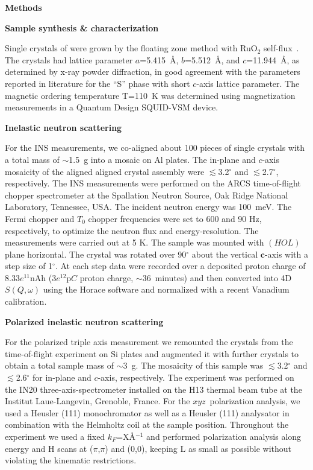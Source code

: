 
\vspace{20 pt}
\noindent
{\bf Methods}

\vspace{10 pt}
\noindent
{\bf Sample synthesis \& characterization}

\noindent
%
Single crystals of \CRO were grown by the floating zone method with RuO$_{2}$
self-flux~\cite{Nakatsuji97,Cao97}. The crystals had lattice parameter
$a$=5.415~\r{A}, $b$=5.512~\r{A}, and $c$=11.944~\r{A}, as determined by x-ray
powder diffraction, in good agreement with the parameters reported in
literature\cite{braden98aps} for the ``S'' phase with short $c$-axis lattice parameter.
The magnetic ordering temperature T=110~K was determined using magnetization
measurements in a Quantum Design SQUID-VSM device.

\vspace{10 pt}
\noindent
{\bf Inelastic neutron scattering}

\noindent
%
For the INS measurements, we co-aligned about 100 pieces of single crystals
with a total mass of $\sim$1.5~g into a mosaic on Al plates. The in-plane and
$c$-axis mosaicity of the aligned aligned crystal assembly were
$\lesssim$3.2$^\circ$ and  $\lesssim$2.7$^\circ$, respectively. The INS
measurements were performed on the ARCS time-of-flight chopper spectrometer at
the Spallation Neutron Source, Oak Ridge National Laboratory, Tennessee, USA.
The incident neutron energy was 100~meV. The Fermi chopper and  $T_{0}$ chopper
frequencies were set to 600 and 90 Hz, respectively, to optimize the neutron
flux and energy-resolution. The measurements were carried out at 5 K. The
sample was mounted with $(HOL)$ plane horizontal. The crystal was rotated over
90$^\circ$  about the vertical $\mathbf{c}$-axis with a step size of 1$^\circ$.
At each step data were recorded over a deposited proton charge of $8.33
e^{11}$nAh ($3 e^{12}$p$C$ proton charge, $\sim 36$~minutes)
and then converted into 4D $S(Q,\omega)$ using the Horace software\cite{horace}
and normalized with a recent Vanadium calibration.

\vspace{10 pt}
\noindent
{\bf Polarized inelastic neutron scattering}

\noindent
%
For the polarized triple axis measurement we remounted the crystals from the
time-of-flight experiment on Si plates and augmented it with further crystals
to obtain a total sample mass of $\sim$3~g.
%
The mosaicity of this sample was $\lesssim$3.2$^\circ$ and 
$\lesssim$2.6$^\circ$ for in-plane and $c$-axis, respectively.
%
The experiment was performed on the IN20 three-axis-spectrometer installed on
the H13 thermal beam tube at the Institut Laue-Langevin, Grenoble, France. For
the $xyz$~polarization analysis, we used a Heusler (111) monochromator as well
as a Heusler (111) analysator in combination with the Helmholtz coil at the
sample position.
%
Throughout the experiment we used a fixed $k_F$=X\r{A}$^{-1}$ and performed
polarization analysis along energy and H scans at ($\pi$,$\pi$) and (0,0),
keeping L as small as possible without violating the kinematic restrictions.



